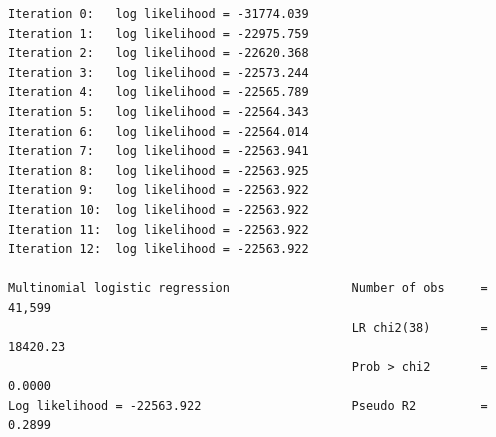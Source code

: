 \documentclass[
]{book}
\begin{document}
\begin{verbatim}
Iteration 0:   log likelihood = -31774.039  
Iteration 1:   log likelihood = -22975.759  
Iteration 2:   log likelihood = -22620.368  
Iteration 3:   log likelihood = -22573.244  
Iteration 4:   log likelihood = -22565.789  
Iteration 5:   log likelihood = -22564.343  
Iteration 6:   log likelihood = -22564.014  
Iteration 7:   log likelihood = -22563.941  
Iteration 8:   log likelihood = -22563.925  
Iteration 9:   log likelihood = -22563.922  
Iteration 10:  log likelihood = -22563.922  
Iteration 11:  log likelihood = -22563.922  
Iteration 12:  log likelihood = -22563.922  

Multinomial logistic regression                 Number of obs     =     41,599
                                                LR chi2(38)       =   18420.23
                                                Prob > chi2       =     0.0000
Log likelihood = -22563.922                     Pseudo R2         =     0.2899


\end{verbatim}
\end{document}
